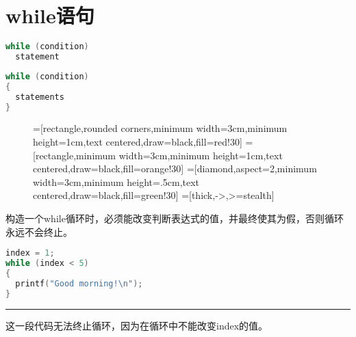 \section{while语句}

\begin{frame}[fragile]\ft{\secname}
\begin{lstlisting}[language=c,backgroundcolor=\color{red!10}]
while (condition)
  statement
\end{lstlisting}
\begin{lstlisting}[language=c,backgroundcolor=\color{red!10}]
while (condition)
{
  statements
}
\end{lstlisting}
\end{frame}

\begin{frame}[fragile]\ft{\secname}
\begin{figure}
\centering
{}=[rectangle,rounded corners,minimum width=3cm,minimum height=1cm,text centered,draw=black,fill=red!30]
=[rectangle,minimum width=3cm,minimum height=1cm,text centered,draw=black,fill=orange!30]
=[diamond,aspect=2,minimum width=3cm,minimum height=.5cm,text centered,draw=black,fill=green!30]
=[thick,->,>=stealth]


\end{figure}

\end{frame}

\begin{frame}[fragile]
构造一个while循环时，必须能改变判断表达式的值，并最终使其为假，否则循环永远不会终止。
\end{frame}

\begin{frame}[fragile]
\begin{lstlisting}[language=c]
index = 1;
while (index < 5)
{
  printf("Good morning!\n");
}
\end{lstlisting} 
\rule{\textwidth}{1mm}\pause \vspace{0.1in}

这一段代码无法终止循环，因为在循环中不能改变index的值。
\end{frame}

